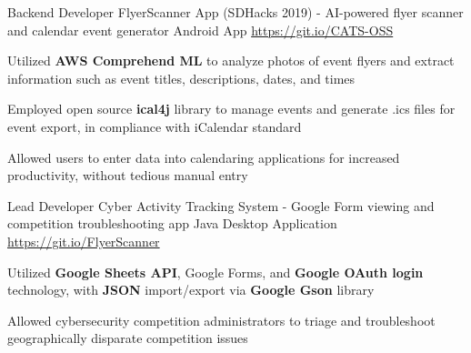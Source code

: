 
\begin{cventries}

  \cventry
    {Backend Developer} %
    {FlyerScanner App (SDHacks 2019) - AI-powered flyer scanner and calendar event generator} %
    {Android App} %
    {\href{https://git.io/CATS-OSS}{https://git.io/CATS-OSS}} %
    {
      \begin{cvitems} %
        \item {Utilized \textbf{AWS Comprehend ML} to analyze photos of event flyers and extract information such as event titles, descriptions, dates, and times}
        \item {Employed open source \textbf{ical4j} library to manage events and generate .ics files for event export, in compliance with iCalendar standard}
        \item {Allowed users to enter data into calendaring applications for increased productivity, without tedious manual entry}
      \end{cvitems}
    }

  \cventry
    {Lead Developer} %
    {Cyber Activity Tracking System - Google Form viewing and competition troubleshooting app} %
    {Java Desktop Application} %
    {\href{https://git.io/FlyerScanner}{https://git.io/FlyerScanner}} %
    {
      \begin{cvitems} %
        \item {Utilized \textbf{Google Sheets API}, Google Forms, and \textbf{Google OAuth login} technology, with \textbf{JSON} import/export via \textbf{Google Gson} library}
        \item {Allowed cybersecurity competition administrators to triage and troubleshoot geographically disparate competition issues}
      \end{cvitems}
    }
    
\end{cventries}